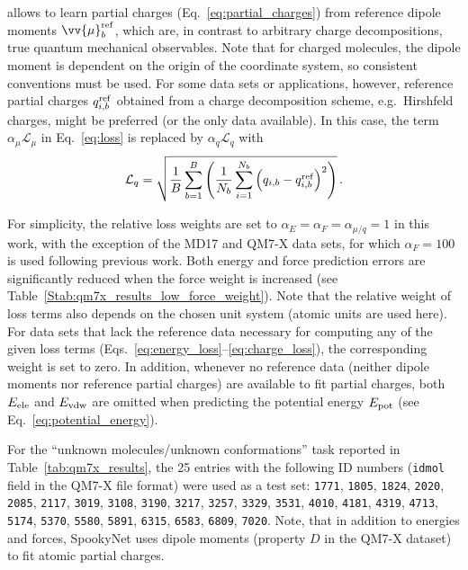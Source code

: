\documentclass[%
superscriptaddress,
reprint,
nofootinbib,
amsmath,amssymb,amsfonts,
floatfix,
altaffilletter,
showkeys,
]{revtex4-2}
\newcommand{\nn}{SpookyNet}
\begin{document}
allows to learn partial charges (Eq.~\ref{eq:partial_charges}) from reference dipole moments $\vv{\mu}_b^{\rm ref}$, which are, in contrast to arbitrary charge decompositions, true quantum mechanical observables.\cite{gastegger2017machine} Note that for charged molecules, the dipole moment is dependent on the origin of the coordinate system, so consistent conventions must be used.
For some data sets or applications, however, reference partial charges $q_{i,b}^{\rm ref}$ obtained from a charge decomposition scheme, e.g.\ Hirshfeld charges,\cite{hirshfeld1977bonded} might be preferred (or the only data available). In this case, the term $\alpha_\mu\mathcal{L}_\mu$ in Eq.~\ref{eq:loss} is replaced by $\alpha_q\mathcal{L}_q$ with
\begin{equation}
\mathcal{L}_q =\sqrt{\frac{1}{B}\sum_{b=1}^{B} \left(\frac{1}{N_b}\sum_{i=1}^{N_b}\left(q_{i,b}-q_{i,b}^{\rm ref}\right)^2\right)}\,.
\label{eq:charge_loss}
\end{equation}

For simplicity, the relative loss weights are set to $\alpha_E=\alpha_F=\alpha_{\mu/q}=1$ in this work, with the exception of the MD17 and QM7-X data sets, for which $\alpha_F=100$ is used following previous work.\cite{unke2019physnet} Both energy and force prediction errors are significantly reduced when the force weight is increased (see Table~\ref{Stab:qm7x_results_low_force_weight}). Note that the relative weight of loss terms also depends on the chosen unit system (atomic units are used here). For data sets that lack the reference data necessary for computing any of the given loss terms (Eqs.~\ref{eq:energy_loss}--\ref{eq:charge_loss}), the corresponding weight is set to zero. In addition, whenever no reference data (neither dipole moments nor reference partial charges) are available to fit partial charges, both $E_{\rm ele}$ and $E_{\rm vdw}$ are omitted when predicting the potential energy $E_{\rm pot}$ (see Eq.~\ref{eq:potential_energy}).

For the ``unknown molecules/unknown conformations'' task reported in Table~\ref{tab:qm7x_results}, the 25 entries with the following ID numbers (\texttt{idmol} field in the QM7-X file format) were used as a test set: \texttt{1771}, \texttt{1805}, \texttt{1824}, \texttt{2020}, \texttt{2085}, \texttt{2117}, \texttt{3019}, \texttt{3108}, \texttt{3190}, \texttt{3217}, \texttt{3257}, \texttt{3329}, \texttt{3531}, \texttt{4010}, \texttt{4181}, \texttt{4319}, \texttt{4713}, \texttt{5174}, \texttt{5370}, \texttt{5580}, \texttt{5891}, \texttt{6315}, \texttt{6583}, \texttt{6809}, \texttt{7020}. Note, that in addition to energies and forces, \nn{} uses dipole moments (property $D$ in the QM7-X dataset) to fit atomic partial charges.\\
\end{document}
